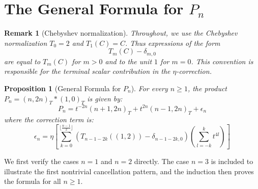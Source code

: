 \documentclass[12pt]{article}
\newtheorem{proposition}[theorem]{Proposition}
\newtheorem{remark}[theorem]{Remark}
\begin{document}
\section{The General Formula for $P_n$}
\label{sec:general-formula}

\begin{remark}[Chebyshev normalization]
Throughout, we use the Chebyshev normalization $T_0=2$ and $T_1(C)=C$. Thus expressions of the form
\[
T_m(C)-\delta_{m,0}
\]
are equal to $T_m(C)$ for $m>0$ and to the unit $1$ for $m=0$. This convention is responsible for the terminal scalar contribution in the $\eta$-correction.
\end{remark}

\begin{proposition}[General Formula for $P_n$]\label{thm:main}
For every $n\geq 1$, the product $P_n = (n, 2n)_T \ast (1,0)_T$ is given by:
\begin{equation}
P_n = t^{-2n}(n+1, 2n)_T + t^{2n}(n-1, 2n)_T + \epsilon_n
\end{equation}
where the correction term is:
\begin{equation}
\epsilon_n = \eta \left[ \sum_{k=0}^{\lfloor\frac{n-1}{2}\rfloor} \left( T_{n-1-2k}((1,2)) - \delta_{n-1-2k, 0} \right) 
\left( \sum_{l=-k}^{k} t^{4l} \right) 
\right]
\end{equation}
\end{proposition}




We first verify the cases $n=1$ and $n=2$ directly. The case $n=3$ is included to illustrate the first nontrivial cancellation pattern, and the induction then proves the formula for all $n\geq 1$.
\end{document}

